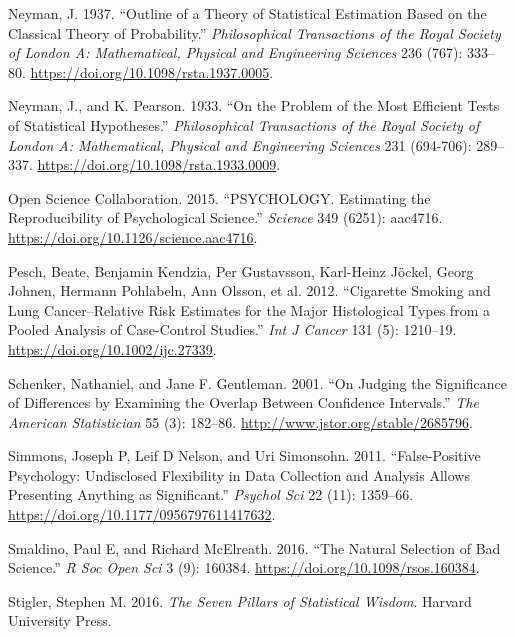 \documentclass[
  12pt,
]{book}
\newlength{\cslhangindent}
\newlength{\cslentryspacingunit} %
\newenvironment{CSLReferences}[2] %
 {%
  \setlength{\parindent}{0pt}
  \ifodd #1
  \let\oldpar\par
  \def\par{\hangindent=\cslhangindent\oldpar}
  \fi
  \setlength{\parskip}{#2\cslentryspacingunit}
 }%
 {}
\begin{document}
\begin{CSLReferences}{1}{0}
\leavevmode{}%
Neyman, J. 1937. {``Outline of a Theory of Statistical Estimation Based on the Classical Theory of Probability.''} \emph{Philosophical Transactions of the Royal Society of London A: Mathematical, Physical and Engineering Sciences} 236 (767): 333--80. \url{https://doi.org/10.1098/rsta.1937.0005}.

\leavevmode{}%
Neyman, J., and K. Pearson. 1933. {``On the Problem of the Most Efficient Tests of Statistical Hypotheses.''} \emph{Philosophical Transactions of the Royal Society of London A: Mathematical, Physical and Engineering Sciences} 231 (694-706): 289--337. \url{https://doi.org/10.1098/rsta.1933.0009}.

\leavevmode{}%
Open Science Collaboration. 2015. {``PSYCHOLOGY. Estimating the Reproducibility of Psychological Science.''} \emph{Science} 349 (6251): aac4716. \url{https://doi.org/10.1126/science.aac4716}.

\leavevmode{}%
Pesch, Beate, Benjamin Kendzia, Per Gustavsson, Karl-Heinz Jöckel, Georg Johnen, Hermann Pohlabeln, Ann Olsson, et al. 2012. {``Cigarette Smoking and Lung Cancer--Relative Risk Estimates for the Major Histological Types from a Pooled Analysis of Case-Control Studies.''} \emph{Int J Cancer} 131 (5): 1210--19. \url{https://doi.org/10.1002/ijc.27339}.

\leavevmode{}%
Schenker, Nathaniel, and Jane F. Gentleman. 2001. {``On Judging the Significance of Differences by Examining the Overlap Between Confidence Intervals.''} \emph{The American Statistician} 55 (3): 182--86. \url{http://www.jstor.org/stable/2685796}.

\leavevmode{}%
Simmons, Joseph P, Leif D Nelson, and Uri Simonsohn. 2011. {``False-Positive Psychology: Undisclosed Flexibility in Data Collection and Analysis Allows Presenting Anything as Significant.''} \emph{Psychol Sci} 22 (11): 1359--66. \url{https://doi.org/10.1177/0956797611417632}.

\leavevmode{}%
Smaldino, Paul E, and Richard McElreath. 2016. {``The Natural Selection of Bad Science.''} \emph{R Soc Open Sci} 3 (9): 160384. \url{https://doi.org/10.1098/rsos.160384}.

\leavevmode{}%
Stigler, Stephen M. 2016. \emph{The Seven Pillars of Statistical Wisdom}. Harvard University Press.


\end{CSLReferences}
\end{document}
